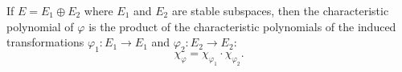 If $E = E_1 \oplus E_2$ where $E_1$ and $E_2$ are stable subspaces, then the characteristic polynomial of $\varphi$ is the product of the characteristic polynomials of the induced transformations $\varphi_1: E_1 \to E_1$ and $\varphi_2: E_2 \to E_2$:
$$\chi_{\varphi} = \chi_{\varphi_1} \cdot \chi_{\varphi_2}.$$
